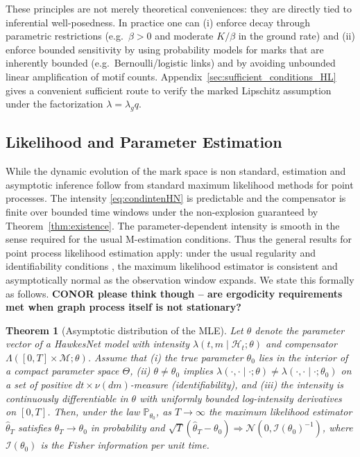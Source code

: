 \documentclass[12pt]{article}
\newtheorem{theorem}{Theorem}[section]
\begin{document}
These principles are not merely theoretical conveniences: they are directly tied to inferential well-posedness. In practice one can (i) enforce decay through parametric restrictions (e.g.\ $\beta>0$ and moderate $K/\beta$ in the ground rate) and (ii) enforce bounded sensitivity by using probability models for marks that are inherently bounded (e.g.\ Bernoulli/logistic links) and by avoiding unbounded linear amplification of motif counts. Appendix~\ref{sec:sufficient_conditions_HL} gives a convenient sufficient route to verify the marked Lipschitz assumption under the factorization $\lambda=\lambda_g q$.

\subsection{Likelihood and Parameter Estimation}\label{sec:likelihood}

While the dynamic evolution of the mark space is non standard, estimation and asymptotic inference follow from standard maximum likelihood methods for point processes\citep{ogata1978estimators, rathbun1996}. The intensity \eqref{eq:condintenHN} is predictable and the compensator is finite over bounded time windows under the non-explosion guaranteed by Theorem~\ref{thm:existence}. The parameter-dependent intensity is smooth in the sense required for the usual M-estimation conditions. Thus the general results for point process likelihood estimation apply: under the usual regularity and identifiability conditions \citep[Ch.~7]{daley2003introduction}, the maximum likelihood estimator is consistent and asymptotically normal as the observation window expands. We state this formally as follows. \textbf{CONOR please think though -- are ergodicity requirements met when graph process itself is not stationary?}

\begin{theorem}[Asymptotic distribution of the MLE]\label{thm:MLE_asymptotics}
Let $\theta$ denote the parameter vector of a HawkesNet model with intensity $\lambda(t,m\mid\mathcal H_t;\theta)$ and compensator $\Lambda([0,T]\times\mathcal M;\theta)$. Assume that (i) the true parameter $\theta_0$ lies in the interior of a compact parameter space $\Theta$, (ii) $\theta\neq\theta_0$ implies $\lambda(\cdot,\cdot\mid\cdot;\theta)\neq \lambda(\cdot,\cdot\mid\cdot;\theta_0)$ on a set of positive $dt\times\nu(dm)$-measure (identifiability), and (iii) the intensity is continuously differentiable in $\theta$ with uniformly bounded log-intensity derivatives on $[0,T]$. Then, under the law $\mathbb P_{\theta_0}$, as $T\to\infty$ the maximum likelihood estimator $\hat\theta_T$ satisfies $\hat\theta_T\to\theta_0$ in probability and $\sqrt{T}(\hat\theta_T-\theta_0)\Rightarrow \mathcal N(0,\mathcal I(\theta_0)^{-1})$, where $\mathcal I(\theta_0)$ is the Fisher information per unit time.
\end{theorem}
\end{document}
